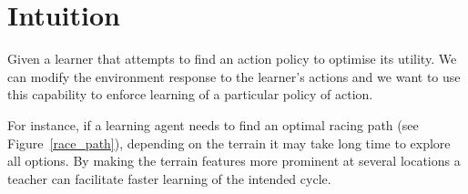 \documentclass[letterpaper]{aamas2009}
\begin{document}



\newpage
\appendix
\section{Intuition}
Given a learner that attempts to find an action policy to optimise its
utility. We can modify the environment response to the learner's
actions and we want to use this capability to enforce learning of a
particular policy of action.

For instance, if a learning agent needs to find an optimal racing path
(see Figure~\ref{race_path}), depending on the terrain it may take long
time to explore all options. By making the terrain features more
prominent at several locations a teacher can facilitate faster
learning of the intended cycle.

\begin{figure*}[ht]
{\center 
{}
\\}
\caption{\label{race_path}Unmodified (passive) and augmented environment dynamics for race path finding (colours naturally encode traversability of the cell)}
\end{figure*}

\end{document}
